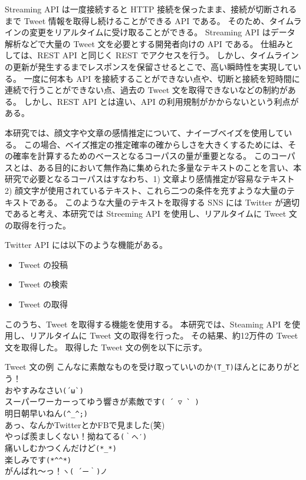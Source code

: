 \documentclass[11pt,a4j]{jsarticle}
\begin{document}
Streaming API は一度接続すると HTTP 接続を保ったまま、接続が切断されるまで Tweet 情報を取得し続けることができる API である。
そのため、タイムラインの変更をリアルタイムに受け取ることができる。
Streaming API はデータ解析などで大量の Tweet 文を必要とする開発者向けの API である。
仕組みとしては、REST API と同じく REST でアクセスを行う。
しかし、タイムラインの更新が発生するまでレスポンスを保留させるとこで、高い瞬時性を実現している。
一度に何本も API を接続することができない点や、切断と接続を短時間に連続で行うことができない点、過去の Tweet 文を取得できないなどの制約がある。
しかし、REST API とは違い、API の利用規制がかからないという利点がある。

本研究では、顔文字や文章の感情推定について、ナイーブベイズを使用している。
この場合、ベイズ推定の推定確率の確からしさを大きくするためには、その確率を計算するためのベースとなるコーパスの量が重要となる。
このコーパスとは、ある目的において無作為に集められた多量なテキストのことを言い、本研究で必要となるコーパスはすなわち、1) 文章より感情推定が容易なテキスト 2) 顔文字が使用されているテキスト、これら二つの条件を充すような大量のテキストである。
このような大量のテキストを取得する SNS には Twitter が適切であると考え、本研究では Streeming API を使用し、リアルタイムに Tweet 文の取得を行った。

Twitter API には以下のような機能がある。

\begin{itemize}
  \item Tweet の投稿
  \item Tweet の検索
  \item Tweet の取得
\end{itemize}

このうち、Tweet を取得する機能を使用する。
本研究では、Steaming API を使用し、リアルタイムに Tweet 文の取得を行った。
その結果、約12万件の Tweet 文を取得した。
取得した Tweet 文の例を以下に示す。

\begin{itembox}[c]{Tweet 文の例}
  こんなに素敵なものを受け取っていいのか\verb|(T_T)|ほんとにありがとう！\\
  おやすみなさい\verb|(´ω`)| \\
  スーパーワーカーってゆう響きが素敵です\verb|( ´ ▽ ` )| \\
  明日朝早いねん\verb|(^_^;)| \\
  あっ、なんかTwitterとかFBで見ました(笑)\\
  やっぱ羨ましくない！拗ねてる\verb|(｀へ′)| \\
  痛いしむかつくんだけど\verb|(*_*)| \\
  楽しみです\verb|(*^^*)| \\
  がんばれ〜っ！\verb|ヽ( ´ー｀)ノ|\\
\end{itembox}
\end{document}
